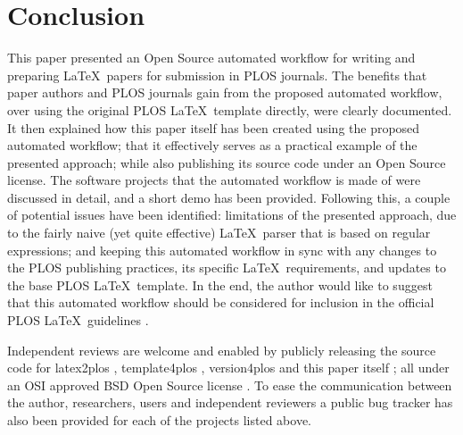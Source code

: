 \section*{Conclusion}

This paper presented an Open Source automated workflow for writing and preparing \LaTeX~papers for submission in PLOS journals.
The benefits that paper authors and PLOS journals gain from the proposed automated workflow, over using the original PLOS \LaTeX~template directly, were clearly documented.
It then explained how this paper itself has been created using the proposed automated workflow; that it effectively serves as a practical example of the presented approach; while also publishing its source code under an Open Source license.
The software projects that the automated workflow is made of were discussed in detail, and a short demo has been provided.
Following this, a couple of potential issues have been identified: limitations of the presented approach, due to the fairly naive (yet quite effective) \LaTeX~parser that is based on regular expressions; and keeping this automated workflow in sync with any changes to the PLOS publishing practices, its specific \LaTeX~requirements, and updates to the base PLOS \LaTeX~template.
In the end, the author would like to suggest that this automated workflow should be considered for inclusion in the official PLOS \LaTeX~guidelines \cite{PLOS:LaTeX}.

Independent reviews are welcome and enabled by publicly releasing the source code for latex2plos \cite{latex2plos}, template4plos \cite{template4plos}, version4plos \cite{version4plos} and this paper itself \cite{paper:code}; all under an OSI approved BSD Open Source license \cite{OSI:BSD}.
To ease the communication between the author, researchers, users and independent reviewers a public bug tracker has also been provided for each of the projects listed above.
